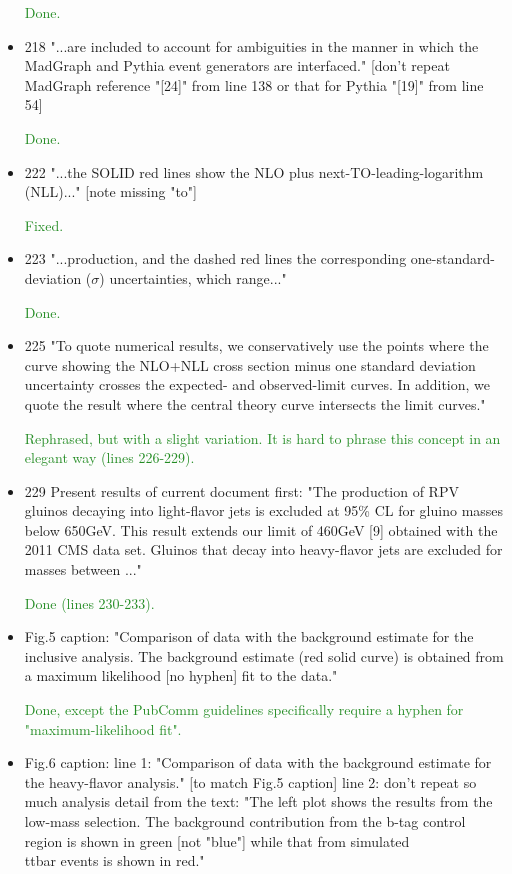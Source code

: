 \documentclass[paper=a4, fontsize=11pt]{scrartcl}
\begin{document}
\begin{itemize}
\textcolor{ForestGreen}{Done.}

\item 218 "...are included to account for ambiguities in the manner in
 which the MadGraph and Pythia event generators are interfaced."
 [don't repeat MadGraph reference "[24]" from line 138 or that
 for Pythia "[19]" from line 54]
 
\textcolor{ForestGreen}{Done.}

\item 222 "...the SOLID red lines show the NLO plus
 next-TO-leading-logarithm (NLL)..."
 [note missing "to"]
 
\textcolor{ForestGreen}{Fixed.}

\item 223 "...production, and the dashed red lines the corresponding
 one-standard-deviation ($\sigma$) uncertainties, which range..."
 
\textcolor{ForestGreen}{Done.}

\item 225 "To quote numerical results, we conservatively use the
 points where the curve showing the NLO+NLL cross section
 minus one standard deviation uncertainty crosses the
 expected- and observed-limit curves.  In addition,
 we quote the result where the central theory curve
 intersects the limit curves."
 
\textcolor{ForestGreen}{Rephrased, but with a slight variation. It is hard to phrase this concept
 in an elegant way (lines 226-229).}

\item 229 Present results of current document first:
 "The production of RPV gluinos decaying into light-flavor jets is
 excluded at 95\% CL for gluino masses below 650GeV.  This result
 extends our limit of 460GeV [9] obtained with the 2011 CMS data set.
 Gluinos that decay into heavy-flavor jets are excluded for masses
 between ..."
 
\textcolor{ForestGreen}{Done (lines 230-233).}

\item Fig.5 caption:
 "Comparison of data with the background estimate for the inclusive
  analysis.  The background estimate (red solid curve) is obtained
  from a maximum likelihood [no hyphen] fit to the data."
 
\textcolor{ForestGreen}{Done, except the PubComm guidelines specifically require a
 hyphen for "maximum-likelihood fit".}

\item Fig.6 caption:
 line 1: "Comparison of data with the background estimate for
   the heavy-flavor analysis." [to match Fig.5 caption]
 line 2: don't repeat so much analysis detail from the text:
   "The left plot shows the results from the low-mass selection.
   The background contribution from the b-tag control region is
   shown in green [not "blue"] while that from simulated \\ttbar
   events is shown in red."
   

\end{itemize}
\end{document}
